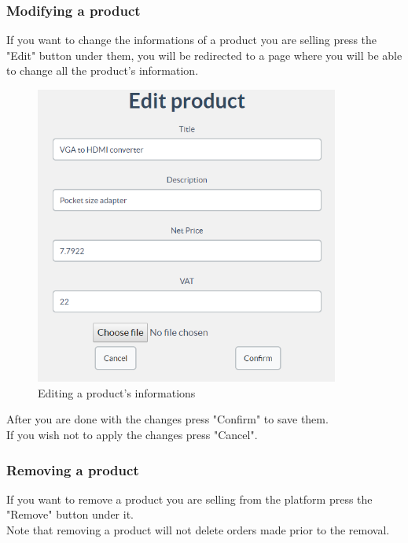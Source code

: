 	\subsubsection{Modifying a product}
	If you want to change the informations of a product you are selling press 
	the "Edit" button under them, you will be redirected to a page where you 
	will be able to change all the product's information.
	\begin{figure}[H]
		\includegraphics[width=10cm]{res/images/edit_product.png}
		\centering
		\caption{Editing a product's informations}
	\end{figure}
	\noindent After you are done with the changes press "Confirm" to save them.
	\\If you wish not to apply the changes press "Cancel".
	
	\subsubsection{Removing a product}
	If you want to remove a product you are selling from the platform press the
	"Remove" button under it.
	\\Note that removing a product will not delete orders made prior to the 
	removal. 
	
